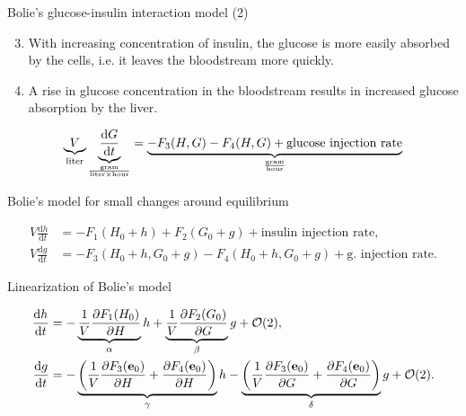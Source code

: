 \documentclass{beamer}
\providecommand{\m}[1]{\ensuremath{\mathrm{#1}}}
\providecommand{\p}[1]{\ensuremath{\partial #1}}
\begin{document}
\begin{frame}{Bolie's glucose-insulin interaction model (2)}

\begin{enumerate}
\setcounter{enumi}{2}
	\item
	With increasing concentration of insulin, the glucose is more easily absorbed by the cells, i.e. it leaves the bloodstream more quickly.
	\item
	A rise in glucose concentration in the bloodstream results in increased glucose absorption by the liver.
\end{enumerate}

\begin{align*}
\underbrace{V}_%
{\text{liter}}%
%
\underbrace{\frac{\m{d} G}{\m{d} t}}_%
{\frac{\text{gram}}{\text{liter} \times\text{hour}}}
=%
\underbrace{-F_3(H,G)-F_4(H,G) +\text{glucose injection rate}}%
_{\frac{\text{gram}}{\text{hour}}}
\end{align*}


\end{frame}

\begin{frame}{Bolie's model for small changes around equilibrium}

\begin{equation*}
\begin{aligned}
V\frac{\m{d}h}{\m{d}t}&=-F_1(H_0+h)+F_2(G_0+g)+ \text{insulin injection rate},\\
V\frac{\m{d}g}{\m{d}t}&=-F_3(H_0+h,G_0+g)-F_4(H_0+h,G_0+g)+ \text{g. injection rate}.
\end{aligned}
\end{equation*}
\end{frame}

\begin{frame}{Linearization of Bolie's model}


\begin{align*}
\frac{\m{d}h}{\m{d}t}&=-\underbrace{%
		\frac{1}{V}\frac{\p F_1(H_0)}{\p H}}_{\alpha}h+%
%
\underbrace{%
		\frac{1}{V}\frac{\p F_2(G_0)}{\p G}}_{\beta}g+\mathcal{O}(2), \\%
%
\frac{\m{d}g}{\m{d}t}&=%
%
-\underbrace{%
\left(\frac{1}{V}\frac{\p F_3(\mathbf{e}_0)}{\p H}+\frac{\p F_4(\mathbf{e}_0)}{\p H}\right)}_{\gamma}h%
-\underbrace{%
\left(\frac{1}{V}\frac{\p F_3(\mathbf{e}_0)}{\p G}+\frac{\p F_4(\mathbf{e}_0)}{\p G}\right)}_{\delta} g+\mathcal{O}(2).
\end{align*}


\end{frame}
\end{document}
